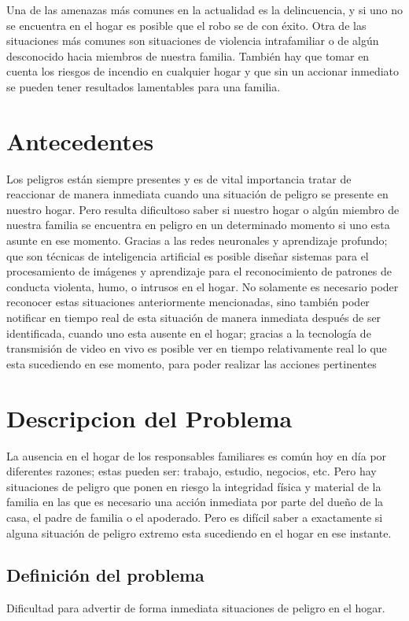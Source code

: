 Una de las amenazas más comunes en la actualidad es la delincuencia, y si uno no se encuentra en el hogar es posible que el robo se de con éxito. Otra de las situaciones más comunes son situaciones de violencia intrafamiliar o de algún desconocido hacia miembros de nuestra familia. También hay que tomar en cuenta los riesgos de incendio en cualquier hogar y que sin un accionar inmediato se pueden tener resultados lamentables para una familia.\\

\section{Antecedentes}
Los peligros están siempre presentes y es de vital importancia tratar de reaccionar de manera inmediata cuando una situación de peligro se presente en nuestro hogar. Pero resulta dificultoso saber si nuestro hogar o algún miembro de nuestra familia se encuentra en peligro en un determinado momento si uno esta asunte en ese momento. Gracias a las redes neuronales y aprendizaje profundo; que son técnicas de inteligencia artificial es posible diseñar sistemas para el procesamiento de imágenes y aprendizaje para el reconocimiento de patrones de conducta violenta, humo, o intrusos en el hogar. No solamente es necesario poder reconocer estas situaciones anteriormente mencionadas, sino también poder notificar en tiempo real de esta situación de manera inmediata después de ser identificada, cuando uno esta ausente en el hogar; gracias a la tecnología de transmisión de video en vivo es posible ver en tiempo relativamente real lo que esta sucediendo en ese momento, para poder realizar las acciones pertinentes

\section{Descripcion del Problema}
La ausencia en el hogar de los responsables familiares es común hoy en día por diferentes razones;  estas pueden ser: trabajo, estudio, negocios, etc. Pero hay situaciones de peligro que ponen en riesgo la integridad física y material de la familia en las que es necesario una acción inmediata por parte del dueño de la casa, el padre de familia o el apoderado. Pero es difícil saber a exactamente si alguna situación de peligro extremo esta sucediendo en el hogar en ese instante.

\subsection{Definición del problema}
Dificultad para advertir de forma inmediata situaciones de peligro en el hogar.

